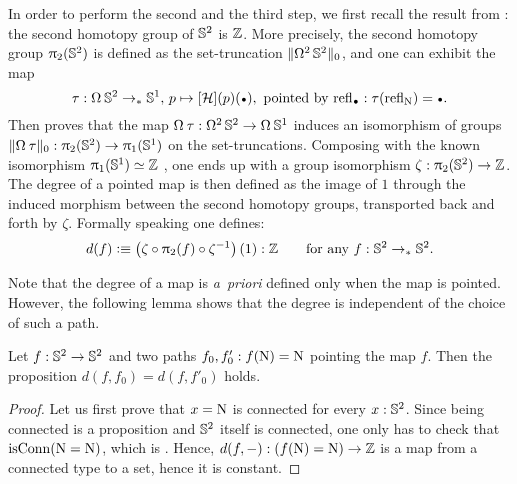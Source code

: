 \documentclass[english,a4paper]{lmcs}
\begin{document}
In order to perform the second and the third step, we first recall the result
from \cite[Cor. 8.5.2]{HoTT}: the second homotopy group of ${{\mathbb S^{2}}}$ is $\mathbb{Z}$. More
precisely, the second homotopy group $\uppi_{2}({{\mathbb S^{2}}})$ is defined as the
set-truncation $\lVert\mathop{\Omega^{2}} {{\mathbb S^{2}}}\rVert_0$, and one can exhibit the map
\begin{equation}\label{eq:tau}
  \tau: \loopspace\null\Sp \ptdto \Sc, \, p \mapsto \ap\hopf(p)(\base),
\text{ pointed by $\refl{\base}:\tau(\refl\north)=\base$}.
\end{equation}
Then \cite[Section 8.4 and 8.5]{HoTT} proves that the map $\loopspace\null\tau :
\loopspace 2 \Sp \to \loopspace \null \Sc$ induces an isomorphism of groups
$\setTrunc{\loopspace\null\tau}: \hgr 2(\Sp) \to \hgr 1(\Sc)$ on the set-truncations.
Composing with the known isomorphism $\uppi_{1}({{\mathbb S^{1}}}) \simeq \mathbb{Z}$ \cite[Cor. 8.1.11]{HoTT}, one
ends up with a group isomorphism $\zeta: \uppi_{2}({{\mathbb S^{2}}}) \to \mathbb{Z}$. The degree of a
pointed map is then defined as the image of $1$ through the induced morphism
between the second homotopy groups, transported back and forth by $\zeta$.
Formally speaking one defines:
\begin{displaymath}
  d(f) \vcentcolon\equiv \left(\zeta\circ\uppi_{2}(f)\circ \zeta^{-1}\right)(1):\mathbb{Z} \qquad
  \text{for any}\ f:{{\mathbb S^{2}}}\to_\ast{{\mathbb S^{2}}}.
\end{displaymath}

Note that the degree of a map is \emph{a~priori} defined only when the map is pointed. However,
the following lemma shows that the degree is independent of the choice of such
a path.
\begin{lem}
  Let $f: {{\mathbb S^{2}}} \to {{\mathbb S^{2}}}$ and two paths $f_0,f_0': f(\mathrm{N}) = \mathrm{N}$
  pointing the map $f$.
  Then the proposition $d(f,f_0) = d(f,f'_0)$ holds.
  \label{lem:deg-independent-path}
\end{lem}
\begin{proof}
  Let us first prove that $x=\mathrm{N}$ is connected for every $x:{{\mathbb S^{2}}}$.
  Since being connected is a proposition and ${{\mathbb S^{2}}}$ itself is connected,
  one only has to check that $\mathrm{isConn}(\mathrm{N}=\mathrm{N})$,
  which is \cite[Cor.~8.3.3]{HoTT}.
  Hence, $d(f,\mathord{{-}}) : (f(\mathrm{N}) = \mathrm{N}) \to \mathbb{Z}$ is a map
  from a connected type to a set,
  hence it is constant.
\end{proof}
\end{document}
